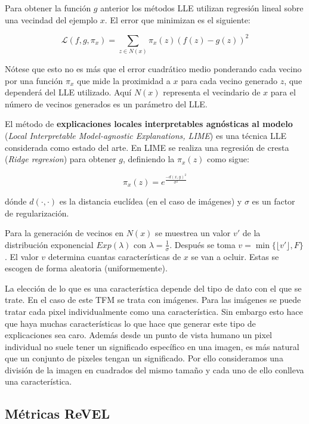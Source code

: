 Para obtener la función $g$ anterior los métodos LLE utilizan regresión lineal sobre una vecindad del ejemplo $x$. El error que minimizan es el siguiente:

\begin{equation}
\mathcal{L}(f,g,\pi_x) = \sum_{z \in N(x)} \pi_x(z)(f(z)-g(z))^2
\end{equation} 

Nótese que esto no es más que el error cuadrático medio ponderando cada vecino por una función $\pi_x$ que mide la proximidad a $x$ para cada vecino generado $z$, que dependerá del LLE utilizado.  Aquí $N(x)$ representa el vecindario de $x$ para el número de vecinos generados es un parámetro del LLE.


El método de \textbf{explicaciones locales interpretables agnósticas al modelo} (\textit{Local Interpretable Model-agnostic Explanations, LIME}) \cite{REVEL,LIME} es una técnica LLE considerada como estado del arte. En LIME se realiza una regresión de cresta (\textit{Ridge regresion}) para obtener $g$, definiendo la $\pi_x(z)$ como sigue:

\begin{equation}
\pi_x(z) = e^{\frac{-d(x,y)^2}{\sigma^2}}
\end{equation}

dónde $d(\cdot,\cdot)$ es la distancia euclídea (en el caso de imágenes) y $\sigma$ es un factor de regularización.

Para la generación de vecinos en $N(x)$ se muestrea un valor $v'$ de la distribución exponencial $Exp(\lambda)$ con $\lambda = \frac{1}{\sigma}$. Después se toma $v = \min\{\lfloor v' \rfloor, F\}$. El valor $v$ determina cuantas características de $x$ se van a ocluir. Estas se escogen de forma aleatoria (uniformemente).

La elección de lo que es una característica depende del tipo de dato con el que se trate. En el caso de este TFM se trata con imágenes. Para las imágenes se puede tratar cada pixel individualmente como una característica. Sin embargo esto hace que haya muchas características lo que hace que generar este tipo de explicaciones sea caro. Además desde un punto de vista humano un pixel individual no suele tener un significado específico en una imagen, es más natural que un conjunto de pixeles tengan un significado. Por ello consideramos una división de la imagen en cuadrados del mismo tamaño y cada uno de ello conlleva una característica.

\subsection{Métricas ReVEL} \label{subsec:revel}

